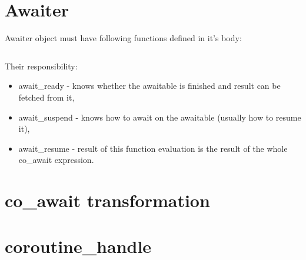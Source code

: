 \documentclass[twoside,twocolumn, 10pt]{article}
\begin{document}
	\section{Awaiter}

	Awaiter object must have following functions defined in it's body:

	\inputminted{c++}{code-examples/theory-custom-coroutine/awaiter.hpp}

	Their responsibility:
	\begin{itemize}
		\item await\_ready - knows whether the awaitable is finished and result can be fetched from it,
		\item await\_suspend - knows how to await on the awaitable (usually how to resume it),
		\item await\_resume - result of this function evaluation is the result of the whole co\_await expression.
	\end{itemize}

	\section{co\_await transformation}

	\section{coroutine\_handle}
\end{document}
